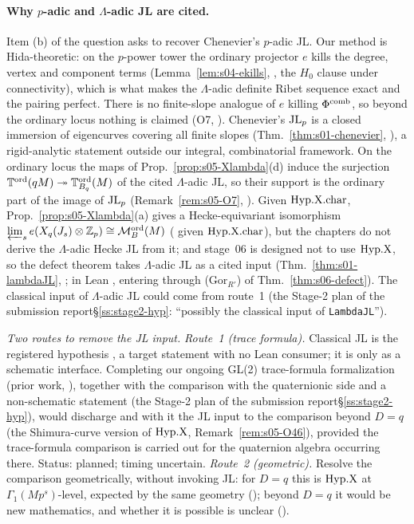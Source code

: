 \paragraph{Why $p$-adic and $\Lambda$-adic JL are cited.} Item (b) of the question asks to recover Chenevier's $p$-adic JL.
Our method is Hida-theoretic: on the $p$-power tower the ordinary projector $e$ kills the degree, vertex and component terms
(Lemma~\ref{lem:s04-ekills}, \stproved{}, the $H_0$ clause under connectivity), which is what makes the $\Lambda$-adic definite Ribet
sequence exact and the pairing perfect. There is no finite-slope analogue of $e$ killing $\Phi^{\mathrm{comb}}$, so beyond the ordinary locus
nothing is claimed (O7, \stopen). Chenevier's $\mathrm{JL}_p$ is a closed immersion of eigencurves covering all finite slopes
(Thm.~\ref{thm:s01-chenevier}, \stcited), a rigid-analytic statement outside our integral, combinatorial framework. On the ordinary
locus the maps of Prop.~\ref{prop:s05-Xlambda}(d) induce the surjection $\mathbb{T}^{\mathrm{ord}}(qM)\twoheadrightarrow\mathbb{T}^{\mathrm{ord}}_{B_q}(M)$ of the
cited $\Lambda$-adic JL, so their support is the ordinary part of the image of $\mathrm{JL}_p$ (Remark~\ref{rem:s05-O7}, \stsketch). Given
$\mathrm{Hyp.X.char}$, Prop.~\ref{prop:s05-Xlambda}(a) gives a Hecke-equivariant isomorphism $\varprojlim_se(X_q(J_s)\otimes\mathbb{Z}_p)\cong\mathcal{M}^{\mathrm{ord}}_B(M)$
(\stproved{} given $\mathrm{Hyp.X.char}$), but the chapters do not derive the $\Lambda$-adic Hecke JL from it; and stage~06 is designed not to
use $\mathrm{Hyp.X}$, so the defect theorem takes $\Lambda$-adic JL as a cited input (Thm.~\ref{thm:s01-lambdaJL}, \stcited; in Lean
, entering through (Gor$_{R'}$) of Thm.~\ref{thm:s06-defect}). The classical input of $\Lambda$-adic JL could come from route~1
(\ifdefined\sOOnoplan the Stage-2 plan of the submission report\else\S\ref{ss:stage2-hyp}\fi: ``possibly the classical input of
\texttt{LambdaJL}'').

\emph{Two routes to remove the JL input.} \emph{Route~1 (trace formula).} Classical JL is the registered hypothesis
, a target statement with no Lean consumer; it is \stformal{} only as a schematic interface. Completing our
ongoing GL(2) trace-formula formalization (prior work, ), together with the comparison
with the quaternionic side and a non-schematic statement (\ifdefined\sOOnoplan the Stage-2 plan of the submission report\else\S\ref{ss:stage2-hyp}\fi), would discharge  and with
it the JL input to the comparison beyond $D=q$ (the Shimura-curve version of $\mathrm{Hyp.X}$, Remark~\ref{rem:s05-O46}), provided the trace-formula comparison is carried out for the quaternion algebra occurring there. Status: planned; timing uncertain. \emph{Route~2 (geometric).} Resolve the comparison
geometrically, without invoking JL: for $D=q$ this is $\mathrm{Hyp.X}$ at $\Gamma_1(Mp^s)$-level, expected by the same geometry (\stexp);
beyond $D=q$ it would be new mathematics, and whether it is possible is unclear (\stopen).

